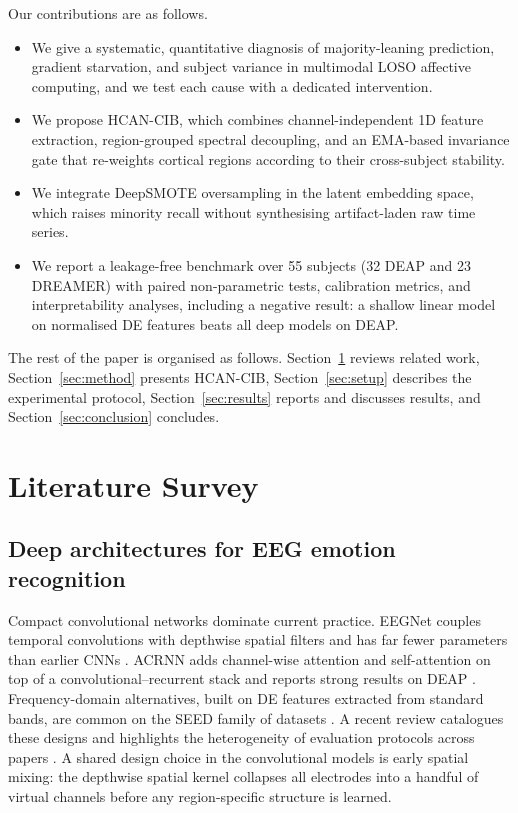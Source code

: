 \documentclass[a4paper,fleqn]{cas-sc}
\begin{document}
Our contributions are as follows.
\begin{itemize}
\item We give a systematic, quantitative diagnosis of majority-leaning prediction, gradient starvation, and subject variance in multimodal LOSO affective computing, and we test each cause with a dedicated intervention.
\item We propose HCAN-CIB, which combines channel-independent 1D feature extraction, region-grouped spectral decoupling, and an EMA-based invariance gate that re-weights cortical regions according to their cross-subject stability.
\item We integrate DeepSMOTE oversampling in the latent embedding space, which raises minority recall without synthesising artifact-laden raw time series.
\item We report a leakage-free benchmark over 55 subjects (32 DEAP and 23 DREAMER) with paired non-parametric tests, calibration metrics, and interpretability analyses, including a negative result: a shallow linear model on normalised DE features beats all deep models on DEAP.
\end{itemize}

The rest of the paper is organised as follows. Section~\ref{sec:related} reviews related work, Section~\ref{sec:method} presents HCAN-CIB, Section~\ref{sec:setup} describes the experimental protocol, Section~\ref{sec:results} reports and discusses results, and Section~\ref{sec:conclusion} concludes.

\section{Literature Survey}
\label{sec:related}

\subsection{Deep architectures for EEG emotion recognition}
Compact convolutional networks dominate current practice. EEGNet couples temporal convolutions with depthwise spatial filters and has far fewer parameters than earlier CNNs \citep{lawhern2018eegnet}. ACRNN adds channel-wise attention and self-attention on top of a convolutional--recurrent stack and reports strong results on DEAP \citep{tao2020acrnn}. Frequency-domain alternatives, built on DE features extracted from standard bands, are common on the SEED family of datasets \citep{duan2013de,zheng2015seed}. A recent review catalogues these designs and highlights the heterogeneity of evaluation protocols across papers \citep{li2022tutorial}. A shared design choice in the convolutional models is early spatial mixing: the depthwise spatial kernel collapses all electrodes into a handful of virtual channels before any region-specific structure is learned.
\end{document}
